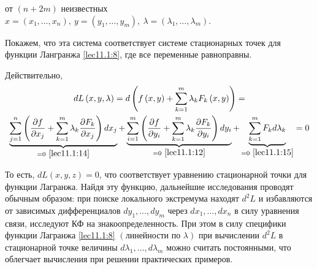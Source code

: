 \documentclass[../../main.tex]{subfiles}
\begin{document}
	от $ \left( n + 2m \right) $ неизвестных $x = \left( 
	x_1, \ldots, x_n \right),\ 
	y = \left( y_1, \ldots, y_m \right),\ \lambda = \left( \lambda_1,
	\ldots, \lambda_m \right) $.
	
	Покажем, что эта система соответствует системе стационарных точек для
	функции Лангранжа \eqref{lec11.1:8}, где все переменные равноправны.
	
	Действительно, 
	\begin{multline*}
	dL\left( x, y, \lambda \right) = d\left( f\left( x, y\right) 
	+ \sum\limits_{k=1}^{m}\lambda_k F_k\left( x, y \right) \right) =
	\\
	\underbrace{\sum\limits_{j=1}^{n}\left( 
	\dfrac{\partial f}{\partial x_j} 
	+ \sum\limits_{k=1}^{m}\lambda_k \dfrac{\partial F_k}
	{\partial x_j}  
	\right)d x_j}_{= 0\ \eqref{lec11.1:14}} + 
	\underbrace{\sum\limits_{i=1}^{m} \left( 
	\dfrac{\partial f}{\partial y_i} 
	+ \sum\limits_{k=1}^{m}\lambda_k \dfrac{\partial F_k}
	{\partial y_i}  \right) dy_i}_{= 0\ 
	\eqref{lec11.1:12}}
	+ \underbrace{\sum\limits_{k=1}^{m} F_k d \lambda_k}
	_{= 0\ \eqref{lec11.1:15}} = 0
	\end{multline*}
	
	То есть, $dL\left( x, y, z \right) = 0$, что соответствует уравнению 
	стационарной точки для функции Лагранжа. Найдя эту функцию, дальнейшие
	исследования проводят обычным образом: при поиске локального экстремума 
	находят $d^2L$ и избавляются от зависимых 
	дифференциалов $d y_1, \ldots, d y_m $ 
	через $d x_1, \ldots, d x_n$ в силу уравнения связи, исследуют КФ на 
	знакоопределенность. При этом в силу специфики функции 
	Лагранжа \eqref{lec11.1:8} 
	$\left( \text{линейности по } \lambda \right) $ при вычислении $d^2 L$
	в стационарной точке величины $d \lambda_1, \ldots, d \lambda_m$ можно
	считать постоянными, что облегчает вычисления при решении практических
	примеров.
	
\end{document}
